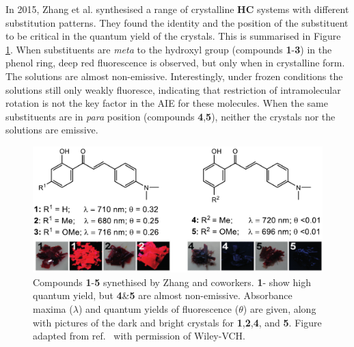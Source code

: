 In 2015, Zhang et al. synthesised a range of crystalline \textbf{HC} systems with different substitution patterns.\cite{Cheng2015} They found the identity and the position of the substituent to be critical in the quantum yield of the crystals. This is summarised in Figure \ref{figure: HC_experimental}. When substituents are \textit{meta} to  the hydroxyl group (compounds \textbf{1}-\textbf{3}) in the phenol ring, deep red fluorescence is observed, but only when in crystalline form. The solutions are almost non-emissive. Interestingly, under frozen conditions the solutions still only weakly fluoresce, indicating that restriction of intramolecular rotation is not the key factor in the \ac{AIE} for these molecules. When the same substituents are in \textit{para} position (compounds \textbf{4},\textbf{5}), neither the crystals nor the solutions are emissive. 
\begin{figure}[H]
\centering
  \includegraphics[width=0.95\linewidth]{1Intro/HC_experimental.pdf}
  \caption[Emission behaviour of crystalline 2'-hydroxychalcone derivatives]{Compounds \textbf{1}-\textbf{5} synethised by Zhang and coworkers. \textbf{1}-\textbf{} show high quantum yield, but \textbf{4}\&\textbf{5} are almost non-emissive. Absorbance maxima ($\lambda$) and quantum yields of fluorescence ($\theta$) are given, along with pictures of the dark and bright crystals for \textbf{1},\textbf{2},\textbf{4}, and \textbf{5}. Figure adapted from ref.~ with permission of Wiley-VCH.}
  \label{figure: HC_experimental}
\end{figure}
